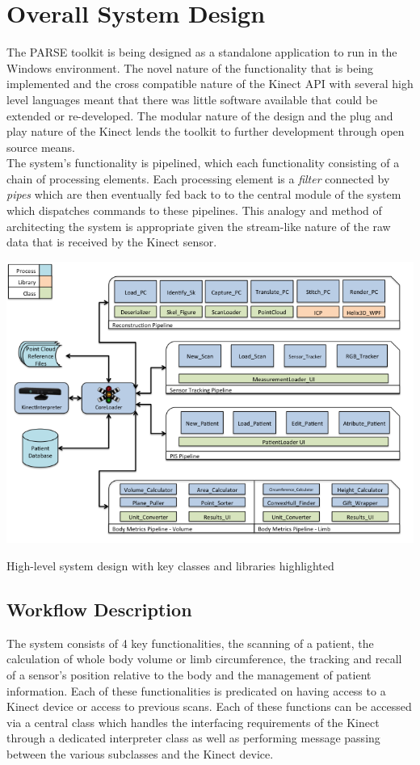 \section{Overall System Design}

The PARSE toolkit is being designed as a standalone application to run in the Windows environment. The novel nature of the functionality that is being implemented and the cross compatible nature of the Kinect API with several high level languages meant that there was little software available that could be extended or re-developed. The modular nature of the design and the plug and play nature of the Kinect lends the toolkit to further development through open source means.\\

The system's functionality is pipelined, which each functionality consisting of a chain of processing elements. Each processing element is a \emph{filter} connected by \emph{pipes} which are then eventually fed back to to the central module of the system which dispatches commands to these pipelines. This analogy and method of architecting the system is appropriate given the stream-like nature of the raw data that is received by the Kinect sensor. \\

\begin{center}
\includegraphics[scale=0.7, angle=90]{images/Slide1.png}
\caption{High-level system design with key classes and libraries highlighted}
\end{center}

\subsection{Workflow Description}
The system consists of 4 key functionalities, the scanning of a patient, the calculation of whole body volume or limb circumference, the tracking and recall of a sensor's position relative to the body and the management of patient information. Each of these functionalities is predicated on having access to a Kinect device or access to previous scans. Each of these functions can be accessed via a central class which handles the interfacing requirements of the Kinect through a dedicated interpreter class as well as performing message passing between the various subclasses and the Kinect device. \\

